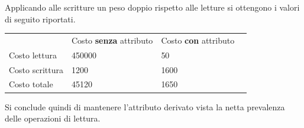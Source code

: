 \documentclass{article}
\begin{document}
Applicando alle scritture un peso doppio rispetto alle letture si ottengono i valori di seguito riportati.
\begin{table}[H]
\renewcommand{\arraystretch}{1.2}
\centering
\begin{tabular}{|p{}|l|l|l|}
\cline{1-3}
& Costo \textbf{senza} attributo & Costo \textbf{con} attributo \\ \cline{1-3}
Costo lettura & 450000 & 50 \\ \cline{1-3}
Costo scrittura & 1200 & 1600 \\ \cline{1-3}
Costo totale & 45120 & 1650 \\ \cline{1-3}
\end{tabular}
\end{table}
Si conclude quindi di mantenere l'attributo derivato vista la netta prevalenza delle operazioni di lettura.

\newpage
\end{document}
